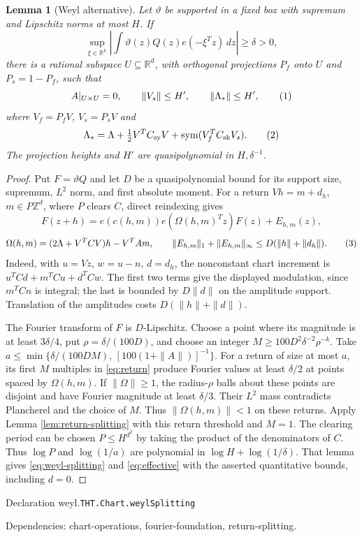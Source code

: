 \documentclass[11pt]{article}
\newtheorem{lemma}[theorem]{Lemma}
\theoremstyle{definition}
\newcommand{\R}{\mathbb R}
\newcommand{\Z}{\mathbb Z}
\newcommand{\sym}{\operatorname{sym}}
\newcommand{\eqtag}[1]{\refstepcounter{equation}\tag{\theequation}\label{#1}}
\numberwithin{equation}{section}
\newcommand{\bp}[3]{\par\smallskip\begingroup\footnotesize
\noindent\hypertarget{bp:#1}{\textsf{Declaration #1.}}\quad\nolinkurl{#2}\par
\noindent\textsf{Dependencies:} #3.\par\endgroup\smallskip}
\begin{document}
\begin{lemma}[Weyl alternative]\label{lem:weyl}
Let $\vartheta$ be supported in a fixed box with supremum and Lipschitz norms at most $H$. If
\[
 \sup_{\xi\in\R^k}\left|\int\vartheta(z)Q(z)e(-\xi^Tz)\,dz\right|\ge\delta>0,
\]
there is a rational subspace $U\subseteq\R^d$, with orthogonal projections $P_f$ onto $U$ and $P_s=1-P_f$, such that
\[
 A|_{U\times U}=0,\qquad \|V_s\|\le H',\qquad \|\Lambda_*\|\le H',
 \eqtag{eq:weyl-splitting}
\]
where $V_f=P_fV$, $V_s=P_sV$ and
\[
 \Lambda_*=\Lambda+\tfrac12V^TC_{\rm sy}V+\sym(V_f^TC_{\rm sk}V_s).
 \eqtag{eq:effective}
\]
The projection heights and $H'$ are quasipolynomial in $H,\delta^{-1}$.
\end{lemma}
\begin{proof}
Put $F=\vartheta Q$ and let $D$ be a quasipolynomial bound for its support size, supremum, $L^2$ norm, and first absolute moment. For a return $Vh=m+d_h$, $m\in P\Z^d$, where $P$ clears $C$, direct reindexing gives
\[
 F(z+h)=e(c(h,m))e(\Omega(h,m)^Tz)F(z)+E_{h,m}(z),
\]
\[
 \Omega(h,m)=(2\Lambda+V^TCV)h-V^TAm,
 \qquad \|E_{h,m}\|_1+\|E_{h,m}\|_\infty\le D(\|h\|+\|d_h\|).
 \eqtag{eq:return}
\]
Indeed, with $u=Vz$, $w=u-n$, $d=d_h$, the nonconstant chart increment is $u^TCd+m^TCu+d^TCw$. The first two terms give the displayed modulation, since $m^TCn$ is integral; the last is bounded by $D\|d\|$ on the amplitude support. Translation of the amplitudes costs $D(\|h\|+\|d\|)$.

The Fourier transform of $F$ is $D$-Lipschitz. Choose a point where its magnitude is at least $3\delta/4$, put $\rho=\delta/(100D)$, and choose an integer $M\ge100D^2\delta^{-2}\rho^{-k}$. Take $a\le\min\{\delta/(100DM),\,[100(1+\|A\|)]^{-1}\}$. For a return of size at most $a$, its first $M$ multiples in \eqref{eq:return} produce Fourier values at least $\delta/2$ at points spaced by $\Omega(h,m)$. If $\|\Omega\|\ge1$, the radius-$\rho$ balls about these points are disjoint and have Fourier magnitude at least $\delta/3$. Their $L^2$ mass contradicts Plancherel and the choice of $M$. Thus $\|\Omega(h,m)\|<1$ on these returns. Apply Lemma \ref{lem:return-splitting} with this return threshold and $M=1$. The clearing period can be chosen $P\le H^{d^2}$ by taking the product of the denominators of $C$. Thus $\log P$ and $\log(1/a)$ are polynomial in $\log H+\log(1/\delta)$. That lemma gives \eqref{eq:weyl-splitting} and \eqref{eq:effective} with the asserted quantitative bounds, including $d=0$.
\end{proof}
\bp{weyl}{THT.Chart.weylSplitting}{chart-operations, fourier-foundation, return-splitting}
\end{document}
